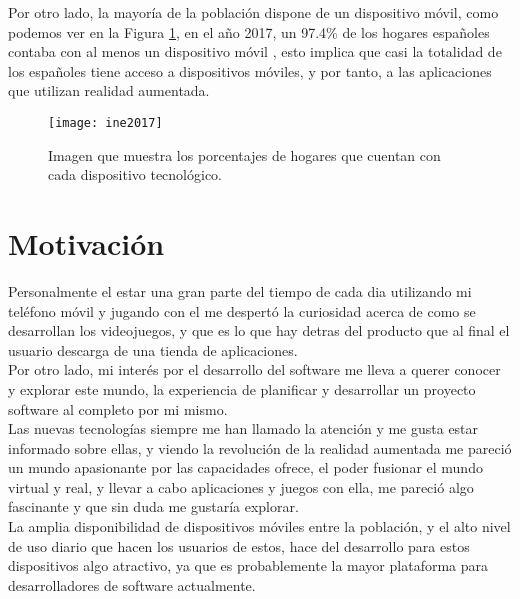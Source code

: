 Por otro lado, la mayoría de la población dispone de un dispositivo móvil, como podemos ver en la Figura \ref{figura-ine}, en el año 2017, un 97.4\% de los hogares españoles contaba con al menos un dispositivo móvil \cite{ine}, esto implica que casi la totalidad de los españoles tiene acceso a dispositivos móviles, y por tanto, a las aplicaciones que utilizan realidad aumentada.

\begin{figure}[h]
  \centering
  \texttt{[image: ine2017]}
  \caption{Imagen que muestra los porcentajes de hogares que cuentan con cada dispositivo tecnológico.\protect\footnotemark}
  \label{figura-ine}
\end{figure}


\newpage

\section{Motivación}
Personalmente el estar una gran parte del tiempo de cada dia utilizando mi teléfono móvil y jugando con el me despertó la curiosidad acerca de como se desarrollan los videojuegos, y que es lo que hay detras del producto que al final el usuario descarga de una tienda de aplicaciones.\\

Por otro lado, mi interés por el desarrollo del software me lleva a querer conocer y explorar este mundo, la experiencia de planificar y desarrollar un proyecto software al completo por mi mismo.\\

Las nuevas tecnologías siempre me han llamado la atención y me gusta estar informado sobre ellas, y viendo la revolución de la realidad aumentada me pareció un mundo apasionante por las capacidades ofrece, el poder fusionar el mundo virtual y real, y llevar a cabo aplicaciones y juegos con ella, me pareció algo fascinante y que sin duda me gustaría explorar.\\

La amplia disponibilidad de dispositivos móviles entre la población, y el alto nivel de uso diario que hacen los usuarios de estos, hace del desarrollo para estos dispositivos algo atractivo, ya que es probablemente la mayor plataforma para desarrolladores de software actualmente.\\

